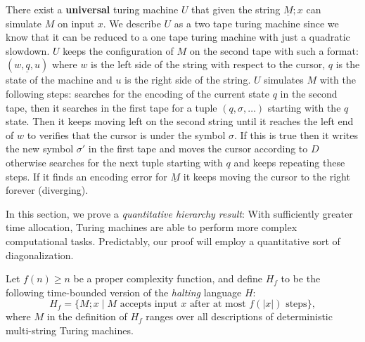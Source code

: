 \documentclass[12pt]{article}
\begin{document}
\begin{defbox}
  There exist a \textbf{universal} turing machine $U$ that given the string $\underline M;x$ can simulate $M$ on input $x$. We describe $U$ as a two tape turing machine since we know that it can be reduced to a one tape turing machine with just a quadratic slowdown. $U$ keeps the configuration of $M$ on the second tape with such a format: $(\underline{w, q, u})$ where $w$ is the left side of the string with respect to the cursor, $q$ is the state of the machine and $u$ is the right side of the string. $U$ simulates $M$ with the following steps: searches for the encoding of the current state $q$ in the second tape, then it searches in the first tape for a tuple $(q,\sigma,\dots)$ starting with the $q$ state. Then it keeps moving left on the second string until it reaches the left end of $w$ to verifies that the cursor is under the symbol $\sigma$. If this is true then it writes the new symbol $\sigma'$ in the first tape and moves the cursor according to $D$ otherwise searches for the next tuple starting with $q$ and keeps repeating these steps. If it finds an encoding error for $\underline M$ it keeps moving the cursor to the right forever (diverging).
  \end{defbox}
In this section, we prove a \textit{quantitative hierarchy result}: With sufficiently greater time allocation, Turing machines are able to perform more complex computational tasks. Predictably, our proof will employ a quantitative sort of diagonalization.

Let $f(n) \geq n$ be a proper complexity function, and define $H_f$ to be the following time-bounded version of the \textit{halting} language $H$:
\[
H_f = \{M; x \;|\; M \text{ accepts input } x \text{ after at most } f(|x|) \text{ steps}\},
\]
where $M$ in the definition of $H_f$ ranges over all descriptions of deterministic multi-string Turing machines. 
\end{document}
